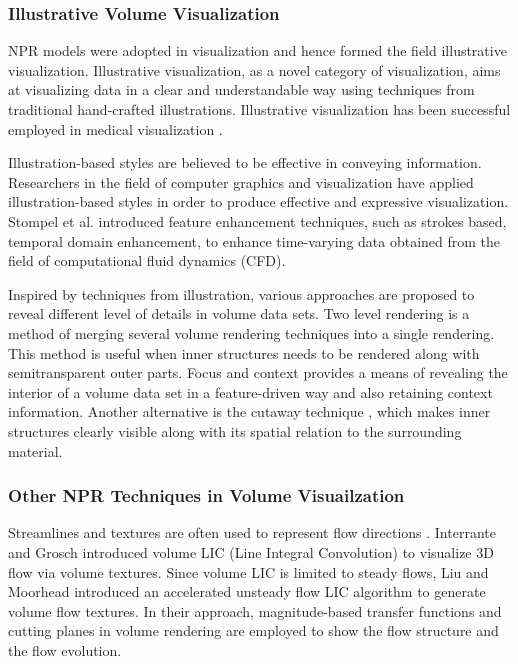 \subsubsection{Illustrative Volume Visualization}
NPR models were adopted in visualization and hence formed the field illustrative visualization.
Illustrative visualization, as a novel category of visualization, aims at visualizing data in a clear and understandable way using techniques from traditional hand-crafted illustrations.
Illustrative visualization has been successful employed in medical visualization \cite{svakhine_illustration_2005} \cite{viola_importance-driven_2005} \cite{svakhine_illustration-inspired_2009}.

Illustration-based styles are believed to be effective in conveying information. Researchers in the field of computer graphics and visualization have applied illustration-based styles in order to produce effective and expressive visualization. Stompel et al. \cite{stompel_visualization_2002} introduced feature enhancement techniques, such as strokes based, temporal domain enhancement, to enhance time-varying data obtained from the field of computational fluid dynamics (CFD).

Inspired by techniques from illustration, various approaches are proposed to reveal different level of details in volume data sets.
Two level rendering \cite{hauser_two-level_2001} \cite{hadwiger_high-quality_2003} \cite{corcoran_perceptual_2010} is a method of merging several volume rendering techniques into a single rendering. This method is useful when inner structures needs to be rendered along with semitransparent outer parts.
Focus and context \cite{wang_magic_2005} \cite{bruckner_illustrative_2006} \cite{chen_intelligent_2008} provides a means of revealing the interior of a volume data set in a feature-driven way and also retaining context information.
Another alternative is the cutaway technique \cite{burns_feature_2007} \cite{sigg_intelligent_2012}, which makes inner structures clearly visible along with its spatial relation to the surrounding material.

\subsubsection{Other NPR Techniques in Volume Visuailzation \label{painterly_rendering}}
Streamlines and textures are often used to represent flow directions \cite{urnessy_techniques_2004}. Interrante and Grosch \cite{interrante_strategies_1997} introduced volume LIC (Line Integral Convolution) to visualize 3D flow via volume textures.
Since volume LIC is limited to steady flows, Liu and Moorhead \cite{liu_texture-based_2005} introduced an accelerated unsteady flow LIC algorithm to generate volume flow textures.
In their approach, magnitude-based transfer functions and cutting planes in volume rendering are employed to show the flow structure and the flow evolution.

